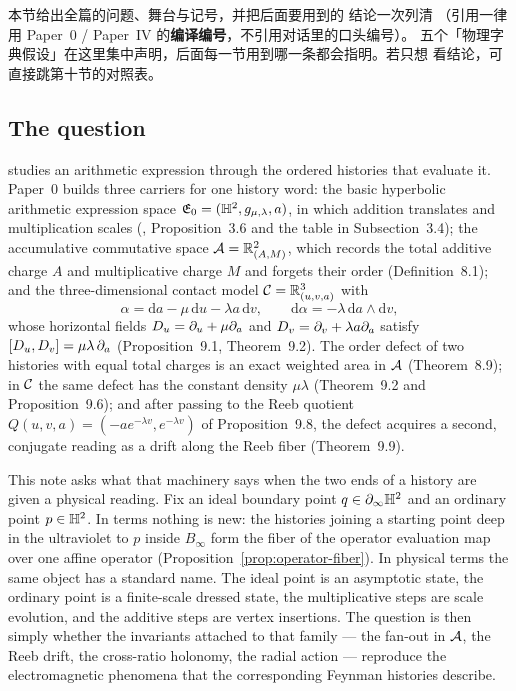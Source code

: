 
\begin{cnread}
本节给出全篇的问题、舞台与记号，并把后面要用到的 \AEG{} 结论一次列清
（引用一律用 Paper~0 / Paper~IV 的\textbf{编译编号}，不引用对话里的口头编号）。
五个「物理字典假设」在这里集中声明，后面每一节用到哪一条都会指明。若只想
看结论，可直接跳第十节的对照表。
\end{cnread}

\subsection{The question}

\AEG{} studies an arithmetic expression through the ordered histories that
evaluate it.  Paper~0 builds three carriers for one history word: the basic
hyperbolic arithmetic expression space $\mathfrak{E}_0=(\mathbb{H}^2,g_{\mu,\lambda},a)$, in
which addition translates and multiplication scales
(\cite{AEG0}, Proposition~3.6 and the table in Subsection~3.4); the
accumulative commutative space $\mathcal{A}=\mathbb{R}^2_{(A,M)}$, which records the total
additive charge $A$ and multiplicative charge $M$ and forgets their order
(Definition~8.1); and the three-dimensional contact model
$\mathcal{C}=\mathbb{R}^3_{(u,v,a)}$ with
\[
  \alpha = \mathrm da-\mu\,\mathrm du-\lambda a\,\mathrm dv,
  \qquad
  \mathrm d\alpha=-\lambda\,\mathrm da\wedge \mathrm dv,
\]
whose horizontal fields $D_u=\partial_u+\mu\partial_a$ and $D_v=\partial_v+\lambda a\partial_a$
satisfy $[D_u,D_v]=\mu\lambda\,\partial_a$ (Proposition~9.1, Theorem~9.2).  The order
defect of two histories with equal total charges is an exact weighted area in
$\mathcal{A}$ (Theorem~8.9); in $\mathcal{C}$ the same defect has the constant density
$\mu\lambda$ (Theorem~9.2 and Proposition~9.6); and after passing to the
Reeb quotient $Q(u,v,a)=(-ae^{-\lambda v},e^{-\lambda v})$ of
Proposition~9.8, the defect acquires a second, conjugate reading as a drift
along the Reeb fiber (Theorem~9.9).

This note asks what that machinery says when the two ends of a history are
given a physical reading.  Fix an ideal boundary point $q\in\partial_\infty\mathbb{H}^2$ and
an ordinary point $p\in\mathbb{H}^2$.  In \AEG{} terms nothing is new: the histories joining a starting point deep in
the ultraviolet to $p$ inside $B_\infty$ form the fiber of the operator
evaluation map over one affine operator (Proposition~\ref{prop:operator-fiber}).  In physical terms the same object has a standard
name.  The ideal point is an asymptotic state, the ordinary point is a
finite-scale dressed state, the multiplicative steps are scale evolution, and
the additive steps are vertex insertions.  The question is then simply whether
the \AEG{} invariants attached to that family --- the fan-out in $\mathcal{A}$, the
Reeb drift, the cross-ratio holonomy, the radial action --- reproduce the
electromagnetic phenomena that the corresponding Feynman histories describe.

